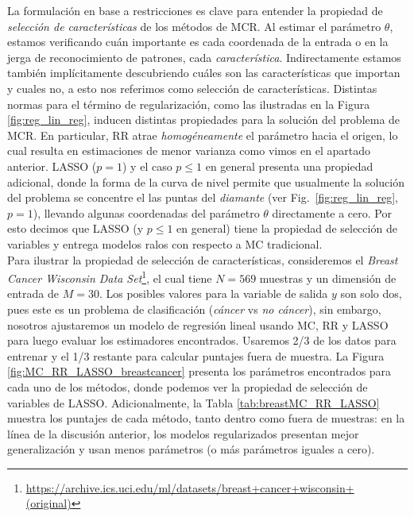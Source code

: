 La formulación en base a restricciones es clave para entender la propiedad de \emph{selección de características} de los métodos de MCR. Al estimar el parámetro $\theta$, estamos verificando cuán importante es cada coordenada de la entrada o en la jerga de reconocimiento de patrones, cada \emph{característica}. Indirectamente estamos también implícitamente descubriendo cuáles son las características que importan y cuales no, a esto nos referimos como selección de características. Distintas normas para el término de regularización, como las ilustradas en la Figura \ref{fig:reg_lin_reg}, inducen distintas propiedades para la solución del problema de MCR. En particular, RR atrae \emph{homogéneamente} el parámetro hacia el origen, lo cual resulta  en estimaciones de menor varianza como vimos en el apartado anterior. LASSO ($p=1$) y el caso $p\leq1$ en general presenta una propiedad adicional, donde la forma de la curva de nivel permite que usualmente la solución del problema se concentre el las puntas del \emph{diamante} (ver Fig.~\ref{fig:reg_lin_reg}, $p=1$), llevando algunas coordenadas del parámetro $\theta$ directamente a cero. Por esto decimos que LASSO (y $p\leq1$ en general) tiene la propiedad de selección de variables y entrega modelos ralos con respecto a MC tradicional. \\


Para ilustrar la propiedad de selección de características, consideremos el \emph{Breast Cancer Wisconsin Data Set}\footnote{\url{https://archive.ics.uci.edu/ml/datasets/breast+cancer+wisconsin+(original)}}, el cual tiene $N=569$ muestras y un dimensión de entrada de $M=30$. Los posibles valores para la variable de salida $y$ son solo dos, pues este es un problema de clasificación (\emph{cáncer} vs \emph{no cáncer}), sin embargo, nosotros ajustaremos un modelo de regresión lineal usando MC, RR y LASSO para luego evaluar los estimadores encontrados. Usaremos 2/3 de los datos para entrenar y el 1/3 restante para calcular puntajes fuera de muestra. La Figura \ref{fig:MC_RR_LASSO_breastcancer} presenta los parámetros encontrados para cada uno de los métodos, donde podemos ver la propiedad de selección de variables de LASSO. Adicionalmente, la Tabla \ref{tab:breastMC_RR_LASSO} muestra los puntajes de cada método, tanto dentro como fuera de muestras: en la línea de la discusión anterior, los modelos regularizados presentan mejor generalización y usan menos parámetros (o más parámetros iguales a cero). 

